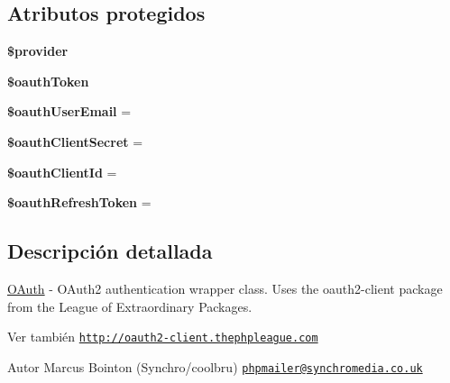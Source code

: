 \subsection*{Atributos protegidos}
\begin{DoxyCompactItemize}
\item 
\mbox{\label{classPHPMailer_1_1PHPMailer_1_1OAuth_a15f2963f6283e29e91812e29ebcbe454}} 
{\bfseries \$provider}
\item 
\mbox{\label{classPHPMailer_1_1PHPMailer_1_1OAuth_ad839c78824f7946f48c5f9c58f148ca5}} 
{\bfseries \$oauth\+Token}
\item 
\mbox{\label{classPHPMailer_1_1PHPMailer_1_1OAuth_a94fce4de59fbf69e28964144691f82dc}} 
{\bfseries \$oauth\+User\+Email} = \textquotesingle{}\textquotesingle{}
\item 
\mbox{\label{classPHPMailer_1_1PHPMailer_1_1OAuth_a6aad19fe065250b5bd496ece9f414e2b}} 
{\bfseries \$oauth\+Client\+Secret} = \textquotesingle{}\textquotesingle{}
\item 
\mbox{\label{classPHPMailer_1_1PHPMailer_1_1OAuth_af3e5e31b8f85412de717c8ad27d91943}} 
{\bfseries \$oauth\+Client\+Id} = \textquotesingle{}\textquotesingle{}
\item 
\mbox{\label{classPHPMailer_1_1PHPMailer_1_1OAuth_a84dc2ab02eca2d0aafcbb178a5a778e9}} 
{\bfseries \$oauth\+Refresh\+Token} = \textquotesingle{}\textquotesingle{}
\end{DoxyCompactItemize}


\subsection{Descripción detallada}
\hyperlink{classPHPMailer_1_1PHPMailer_1_1OAuth}{O\+Auth} -\/ O\+Auth2 authentication wrapper class. Uses the oauth2-\/client package from the League of Extraordinary Packages.

\begin{DoxySeeAlso}{Ver también}
\href{http://oauth2-client.thephpleague.com}{\tt http\+://oauth2-\/client.\+thephpleague.\+com}
\end{DoxySeeAlso}
\begin{DoxyAuthor}{Autor}
Marcus Bointon (Synchro/coolbru) \href{mailto:phpmailer@synchromedia.co.uk}{\tt phpmailer@synchromedia.\+co.\+uk} 
\end{DoxyAuthor}


